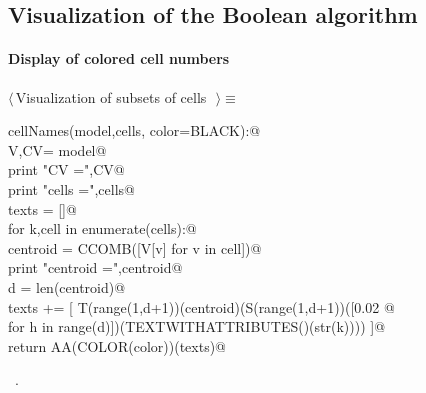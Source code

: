 \documentclass[11pt,oneside]{article}	%
\begin{document}
\subsection{Visualization of the Boolean algorithm}

\paragraph{Display of colored cell numbers}

\begin{flushleft} \small \label{scrap17}
$\langle\,$Visualization of subsets of cells\nobreak\ {\footnotesize {}}$\,\rangle\equiv$
\vspace{-1ex}
\begin{list}{}{} \item
\mbox{}\verb@def cellNames(model,cells, color=BLACK):@\\
\mbox{}\verb@   V,CV= model@\\
\mbox{}\verb@   print "\n CV =",CV@\\
\mbox{}\verb@   print "\n cells =",cells@\\
\mbox{}\verb@   texts = []@\\
\mbox{}\verb@   for k,cell in enumerate(cells):@\\
\mbox{}\verb@      centroid = CCOMB([V[v] for v in cell])@\\
\mbox{}\verb@      print "centroid =",centroid@\\
\mbox{}\verb@      d = len(centroid)@\\
\mbox{}\verb@      texts += [ T(range(1,d+1))(centroid)(S(range(1,d+1))([0.02 @\\
\mbox{}\verb@                  for h in range(d)])(TEXTWITHATTRIBUTES()(str(k)))) ]@\\
\mbox{}\verb@   return AA(COLOR(color))(texts)@\\
\mbox{}\verb@@{\NWsep}
\end{list}
\vspace{-1ex}
\footnotesize\addtolength{\baselineskip}{-1ex}
\begin{list}{}{\setlength{\itemsep}{-\parsep}\setlength{\itemindent}{-\leftmargin}}
\item \NWtxtMacroRefIn\ .
\end{list}
\end{flushleft}
\end{document}
